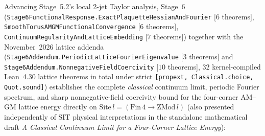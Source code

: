 Advancing Stage~5.2's local 2-jet Taylor analysis, Stage~6 (\texttt{Stage6FunctionalResponse.\allowbreak{}ExactPlaquetteHessianAndFourier} [$6$ theorems], \texttt{SmoothTorusAMGMFunctionalConvergence} [$6$ theorems], \texttt{ContinuumRegularityAndLatticeEmbedding} [$7$ theorems]) together with the November~2026 lattice addenda (\texttt{Stage6Addendum.\allowbreak{}PeriodicLatticeFourierEigenvalue} [$3$ theorems] and \texttt{Stage6Addendum.\allowbreak{}NonnegativeFieldCoercivity} [$10$ theorems], $32$ kernel-compiled Lean~4.30 lattice theorems in total under strict \texttt{[propext, Classical.\allowbreak{}choice, Quot.\allowbreak{}sound]}) establishes the complete \emph{classical} continuum limit, periodic Fourier spectrum, and sharp nonnegative-field coercivity bound for the four-corner AM--GM lattice energy directly on $\mathrm{Site}\,l = (\mathrm{Fin}\,4 \to \mathrm{ZMod}\,l)$ (also presented independently of SIT physical interpretations in the standalone mathematical draft \emph{A Classical Continuum Limit for a Four-Corner Lattice Energy}):
